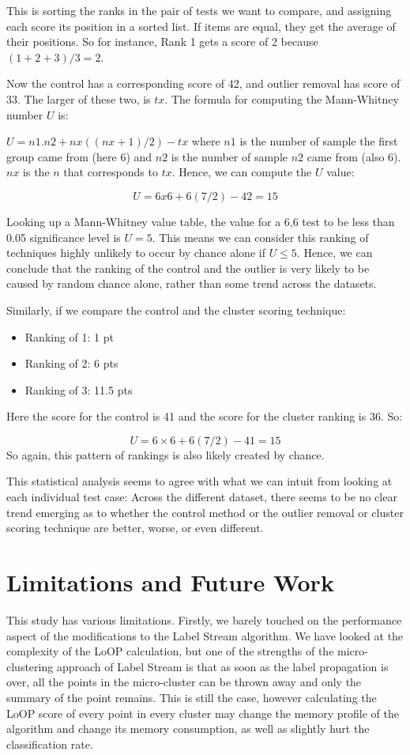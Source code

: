 \documentclass[12pt,a4paper,oneside]{report}
\begin{document}
This is sorting the ranks in the pair of tests we want to compare, and assigning each score its position in a sorted list. If items are equal, they get the average of their positions. So for instance, Rank 1 gets a score of 2 because $(1+2+3)/3 = 2$.

Now the control has a corresponding score of 42, and outlier removal has score of 33. The larger of these two, is $tx$. The formula for computing the Mann-Whitney number $U$ is:

$U = n1.n2 + nx((nx+1)/2) - tx$
where $n1$ is the number of sample the first group came from (here 6) and $n2$ is the number of sample $n2$ came from (also 6). $nx$ is the $n$ that corresponds to $tx$. Hence, we can compute the $U$ value:

\[U = 6x6 + 6(7/2) - 42 = 15\]

Looking up a Mann-Whitney value table, the value for a 6,6 test to be less than 0.05 significance level is $U =5$.
This means we can consider this ranking of techniques highly unlikely to occur by chance alone if $ U \leq 5$. Hence, we can conclude that the ranking of the control and the outlier is very likely to be caused by random chance alone, rather than some trend across the datasets. 

Similarly,  if we compare the control and the cluster scoring technique:
\begin{itemize}
	\item Ranking of 1: 1 pt
	\item Ranking of 2: 6 pts
	\item Ranking of 3: 11.5 pts
\end{itemize}

Here the score for the control is 41 and the score for the cluster ranking is 36. So:

\[U = 6\times6 + 6(7/2) - 41 = 15\]
So again, this pattern of rankings is also likely created by chance. 

This statistical analysis seems to agree with what we can intuit from looking at each individual test case: Across the different dataset, there seems to be no clear trend emerging as to whether the control method or the outlier removal or cluster scoring technique are better, worse, or even different. 

\section*{Limitations and Future Work}

This study has various limitations. Firstly, we barely touched on the performance aspect of the modifications to the Label Stream algorithm. We have looked at the complexity of the LoOP calculation, but one of the strengths of the micro-clustering approach of Label Stream is that as soon as the label propagation is over, all the points in the micro-cluster can be thrown away and only the summary of the point remains. This is still the case, however calculating the LoOP score of every point in every cluster may change the memory profile of the algorithm and change its memory consumption, as well as slightly hurt the classification rate. 
\end{document}
